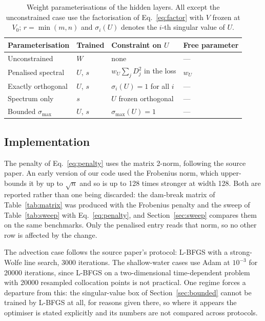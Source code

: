 \documentclass[11pt]{article}
\newcommand{\DU}{D}
\newcommand{\wU}{w_U}
\begin{document}
\begin{table}[htbp]
\centering
\caption{Weight parameterisations of the hidden layers. All except the
unconstrained case use the factorisation of Eq.~\eqref{eq:factor} with $V$
frozen at $V_0$; $r = \min(m,n)$ and $\sigma_i(U)$ denotes the $i$-th singular
value of $U$.}
\label{tab:regimes}
\small
\begin{tabular}{llll}
\toprule
Parameterisation & Trained & Constraint on $U$ & Free parameter \\
\midrule
Unconstrained      & $W$      & none & --- \\
Penalised spectral & $U$, $s$ & $\wU \sum_j \DU_j^2$ in the loss & $\wU$ \\
Exactly orthogonal & $U$, $s$ & $\sigma_i(U) = 1$ for all $i$ & --- \\
Spectrum only      & $s$      & $U$ frozen orthogonal & --- \\
Bounded $\sigma_{\max}$ & $U$, $s$ & $\sigma_{\max}(U) = 1$ & --- \\
\bottomrule
\end{tabular}
\end{table}

\subsection{Implementation}

The penalty of Eq.~\eqref{eq:penalty} uses the matrix 2-norm, following the
source paper. An early version of our code used the Frobenius norm, which
upper-bounds it by up to $\sqrt{n}$ and so is up to 128 times stronger at width
128. Both are reported rather than one being discarded: the dam-break matrix of
Table~\ref{tab:matrix} was produced with the Frobenius penalty and the sweep of
Table~\ref{tab:sweep} with Eq.~\eqref{eq:penalty}, and
Section~\ref{sec:sweep} compares them on the same benchmarks. Only the
penalised entry reads that norm, so no other row is affected by the change.

The advection case follows the source paper's protocol: L-BFGS with a
strong-Wolfe line search, 3000 iterations. The shallow-water cases use Adam at
$10^{-3}$ for 20000 iterations, since L-BFGS on a two-dimensional
time-dependent problem with 20000 resampled collocation points is not
practical. One regime forces a departure from this: the singular-value box of
Section~\ref{sec:bounded} cannot be trained by L-BFGS at all, for reasons given
there, so where it appears the optimiser is stated explicitly and its numbers
are not compared across protocols.
\end{document}
